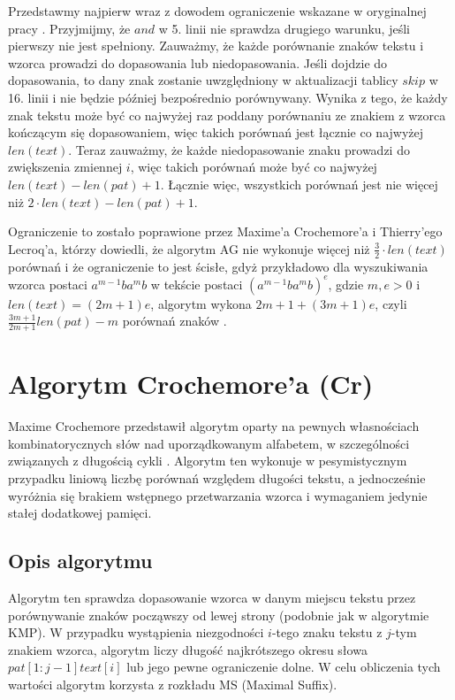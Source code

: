 Przedstawmy najpierw wraz z dowodem ograniczenie wskazane w oryginalnej pracy \cite{AG}. Przyjmijmy, że $and$ w 5. linii nie sprawdza drugiego warunku, jeśli pierwszy nie jest spełniony. Zauważmy, że każde porównanie znaków tekstu i wzorca prowadzi do dopasowania lub niedopasowania. Jeśli dojdzie do dopasowania, to dany znak zostanie uwzględniony w aktualizacji tablicy $skip$ w 16. linii i nie będzie później bezpośrednio porównywany. Wynika z tego, że każdy znak tekstu może być co najwyżej raz poddany porównaniu ze znakiem z wzorca kończącym się dopasowaniem, więc takich porównań jest łącznie co najwyżej $len(text)$. Teraz zauważmy, że każde niedopasowanie znaku prowadzi do zwiększenia zmiennej $i$, więc takich porównań może być co najwyżej $len(text) - len(pat) + 1$. Łącznie więc, wszystkich porównań jest nie więcej niż $2 \cdot len(text) - len(pat) + 1$.

Ograniczenie to zostało poprawione przez Maxime'a Crochemore'a i Thierry'ego Lecroq'a, którzy dowiedli, że algorytm AG nie wykonuje więcej niż $\frac{3}{2} \cdot len(text)$ porównań i że ograniczenie to jest ścisłe, gdyż przykładowo dla wyszukiwania wzorca postaci $a^{m-1}ba^{m}b$ w tekście postaci $(a^{m-1}ba^{m}b)^{e}$, gdzie $m,e > 0$ i $len(text) = (2m+1)e$, algorytm wykona $2m+1+(3m+1)e$, czyli $\frac{3m+1}{2m+1}len(pat)-m$ porównań znaków \cite{AG-CrLc}.

\newpage
\section{Algorytm Crochemore'a (Cr)}
Maxime Crochemore przedstawił algorytm oparty na pewnych własnościach kombinatorycznych słów nad uporządkowanym alfabetem, w szczególności związanych z długością cykli \cite{Cr-or}. Algorytm ten wykonuje w pesymistycznym przypadku liniową liczbę porównań względem długości tekstu, a jednocześnie wyróżnia się brakiem wstępnego przetwarzania wzorca i wymaganiem jedynie stałej dodatkowej pamięci.

\subsection{Opis algorytmu}
Algorytm ten sprawdza dopasowanie wzorca w danym miejscu tekstu przez porównywanie znaków począwszy od lewej strony (podobnie jak w algorytmie KMP). W przypadku wystąpienia niezgodności $i$-tego znaku tekstu z $j$-tym znakiem wzorca, algorytm liczy długość najkrótszego okresu słowa $pat[1:j-1]text[i]$ lub jego pewne ograniczenie dolne. W celu obliczenia tych wartości algorytm korzysta z rozkładu MS (Maximal Suffix). 


